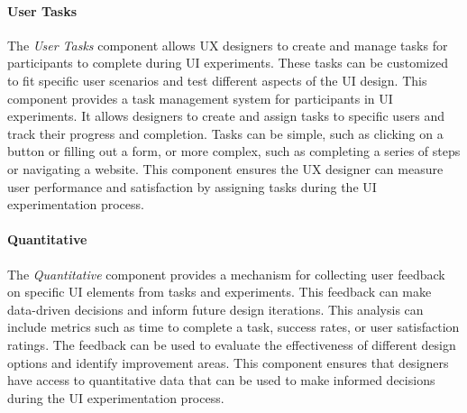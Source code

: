 
\paragraph{User Tasks}
The \textit{User Tasks} component allows UX designers to create and manage tasks for participants to complete during UI experiments. These tasks can be customized to fit specific user scenarios and test different aspects of the UI design.
This component provides a task management system for participants in UI experiments. 
It allows designers to create and assign tasks to specific users and track their progress and completion. 
Tasks can be simple, such as clicking on a button or filling out a form, or more complex, such as completing a series of steps or navigating a website. 
This component ensures the UX designer can measure user performance and satisfaction by assigning tasks during the UI experimentation process.

\paragraph{Quantitative}
The \textit{Quantitative} component provides a mechanism for collecting user feedback on specific UI elements from tasks and experiments. 
This feedback can make data-driven decisions and inform future design iterations.
This analysis can include metrics such as time to complete a task, success rates, or user satisfaction ratings. 
The feedback can be used to evaluate the effectiveness of different design options and identify improvement areas. 
This component ensures that designers have access to quantitative data that can be used to make informed decisions during the UI experimentation process.

